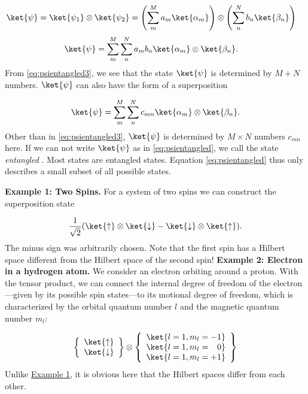 \begin{align}
 \label{eq:psientangled} 
	\ket{\psi}	&=\ket{\psi_1}\otimes\ket{\psi_2}=\left(\sum_m^M a_m \ket{\alpha_m}\right) \otimes \left(\sum_n^N b_n \ket{\beta_n}\right)
\end{align}
\begin{align}
\ket{\psi}	&=\sum_m^M \sum_n^N a_m b_n \ket{\alpha_m} \otimes \ket{\beta_n}. \label{eq:psientangled3} 
\end{align}
From \eqref{eq:psientangled3}, we see that the state $\ket{\psi}$ is determined by $M + N$ numbers. $\ket{\psi}$ can also have the form of a superposition

\begin{align}
\ket{\psi}=\sum_m^M \sum_n^N c_{mn}\ket{\alpha_m}\otimes \ket{\beta_n}.
\end{align}
Other than in \eqref{eq:psientangled3}, $\ket{\psi}$ is determined by $M \times N$ numbers $c_{mn}$ here. If we can not write $\ket{\psi}$ as in \eqref{eq:psientangled}, we call the state \emph{entangled} . Most states are entangled states. Equation \eqref{eq:psientangled} thus only describes a small subset of all possible states.

\textbf{Example 1: Two Spins.}\label{sec:examplespin}  For a system of two spins we can construct the superposition state

\begin{align}
						\frac{1}{\sqrt{2}}(\ket{\uparrow}\otimes\ket{\downarrow}-\ket{\downarrow}\otimes\ket{\uparrow}).
					
\end{align}
	The minus sign was arbitrarily chosen.
					Note that the first spin has a Hilbert space different from the Hilbert space of the second spin!
				\textbf{Example 2: Electron in a hydrogen atom.} We consider an electron orbiting around a proton. With the tensor product, we can connect the internal degree of freedom of the electron---given by its possible spin states---to its motional degree of freedom, which is characterized by the orbital quantum number $l$ and the magnetic quantum number $m_l$:

\begin{align}
						\left\{

\begin{array}
{c} \ket{\uparrow} \\ \ket{\downarrow} \end{array}
 \right\} \otimes \left\{

\begin{array}
{c} \ket{l=1,m_l=-1} \\ \ket{l=1,m_l=\enspace \; 0} \\ \ket{l=1,m_l=+1}  \end{array}
 \right\}
					
\end{align}
Unlike \hyperref[sec:examplespin]{Example 1}, it is obvious here that the Hilbert spaces differ from each other.